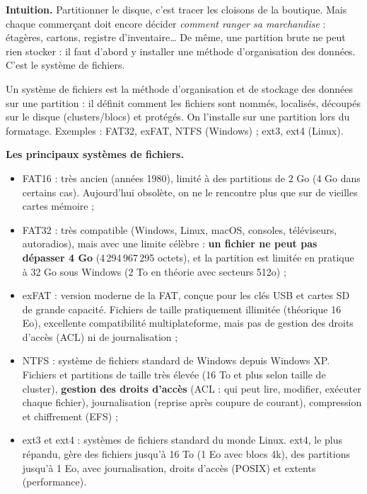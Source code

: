 \documentclass[11pt]{article}
\newcommand{\cle}[1]{{\popxbold\color{popdark}#1}}
\newcounter{popsec}
\newcounter{popsub}
\newcommand{\courssub}[1]{%
  \stepcounter{popsub}%
  \par\vspace{9pt}\noindent{\popxbold\fontsize{11.5}{13}\selectfont\color{popink}{\color{poporange}\thepopsec.\thepopsub}\hspace{6pt}#1}\par\nopagebreak\vspace{4pt}
}
\begin{document}
\courssub{Les systèmes de fichiers}

\textbf{Intuition.} Partitionner le disque, c'est tracer les cloisons de la boutique. Mais chaque commerçant doit encore décider \emph{comment ranger sa marchandise} : étagères, cartons, registre d'inventaire\ldots{} De même, une partition brute ne peut rien stocker : il faut d'abord y installer une méthode d'organisation des données. C'est le système de fichiers.

\begin{definition}
Un \cle{système de fichiers} est la méthode d'organisation et de stockage des données sur une partition : il définit comment les fichiers sont nommés, localisés, découpés sur le disque (clusters/blocs) et protégés. On l'installe sur une partition lors du \cle{formatage}. Exemples : FAT32, exFAT, NTFS (Windows) ; ext3, ext4 (Linux).
\end{definition}

\textbf{Les principaux systèmes de fichiers.}

\begin{itemize}
\item \cle{FAT16} : très ancien (années 1980), limité à des partitions de 2 Go (4 Go dans certains cas). Aujourd'hui obsolète, on ne le rencontre plus que sur de vieilles cartes mémoire ;
\item \cle{FAT32} : très compatible (Windows, Linux, macOS, consoles, téléviseurs, autoradios), mais avec une limite célèbre : \textbf{un fichier ne peut pas dépasser 4 Go} (4\,294\,967\,295 octets), et la partition est limitée en pratique à 32 Go sous Windows (2 To en théorie avec secteurs 512o) ;
\item \cle{exFAT} : version moderne de la FAT, conçue pour les clés USB et cartes SD de grande capacité. Fichiers de taille pratiquement illimitée (théorique 16 Eo), excellente compatibilité multiplateforme, mais pas de gestion des droits d'accès (ACL) ni de journalisation ;
\item \cle{NTFS} : système de fichiers standard de Windows depuis Windows XP. Fichiers et partitions de taille très élevée (16 To et plus selon taille de cluster), \textbf{gestion des droits d'accès} (ACL : qui peut lire, modifier, exécuter chaque fichier), journalisation (reprise après coupure de courant), compression et chiffrement (EFS) ;
\item \cle{ext3} et \cle{ext4} : systèmes de fichiers standard du monde Linux. ext4, le plus répandu, gère des fichiers jusqu'à 16 To (1 Eo avec blocs 4k), des partitions jusqu'à 1 Eo, avec journalisation, droits d'accès (POSIX) et extents (performance).
\end{itemize}
\end{document}

